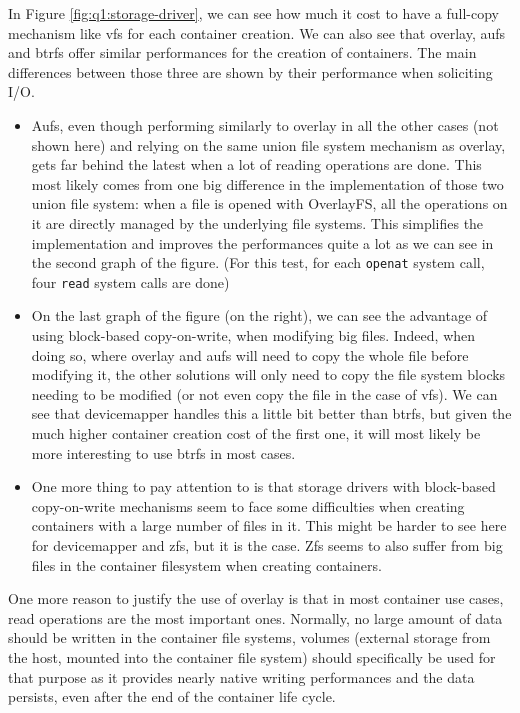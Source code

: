 In Figure \ref{fig:q1:storage-driver}, we can see how much it cost to have a full-copy mechanism like vfs for each container creation.  We can also see that overlay, aufs and btrfs offer similar performances for the creation of containers.  The main differences between those three are shown by their performance when soliciting I/O.  
\begin{itemize}
  \item Aufs, even though performing similarly to overlay in all the other cases (not shown here) and relying on the same union file system mechanism as overlay, gets far behind the latest when a lot of reading operations are done.  This most likely comes from one big difference in the implementation of those two union file system: when a file is opened with OverlayFS, all the operations on it are directly managed by the underlying file systems.  This simplifies the implementation and improves the performances quite a lot as we can see in the second graph of the figure.  (For this test, for each \texttt{openat} system call, four \texttt{read} system calls are done)
  \item On the last graph of the figure (on the right), we can see the advantage of using block-based copy-on-write, when modifying big files.  Indeed, when doing so, where overlay and aufs will need to copy the whole file before modifying it, the other solutions will only need to copy the file system blocks needing to be modified (or not even copy the file in the case of vfs).  We can see that devicemapper handles this a little bit better than btrfs, but given the much higher container creation cost of the first one, it will most likely be more interesting to use btrfs in most cases.
  \item One more thing to pay attention to is that storage drivers with block-based copy-on-write mechanisms seem to face some difficulties when creating containers with a large number of files in it.  This might be harder to see here for devicemapper and zfs, but it is the case.  Zfs seems to also suffer from big files in the container filesystem when creating containers.
\end{itemize}
One more reason to justify the use of overlay is that in most container use cases, read operations are the most important ones.  Normally, no large amount of data should be written in the container file systems, volumes (external storage from the host, mounted into the container file system) should specifically be used for that purpose as it provides nearly native writing performances and the data persists, even after the end of the container life cycle.

